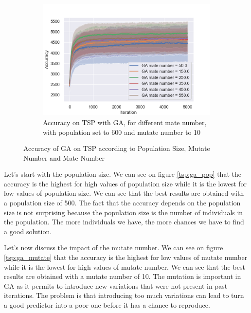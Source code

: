 \documentclass[10pt]{article}
\begin{document}
\begin{figure}[h]
\begin{subfigure}[t]{0.32\columnwidth}
						\includegraphics[width=\linewidth]{../graphics/tsp_GA_Iteration_Error_GA_mate_number.png}
						\caption{Accuracy on TSP with GA, for different mate number, with population set to 600 and mutate number to 10}
						\label{tsp:ga_mate}
					\end{subfigure}
					\caption{Accuracy of GA on TSP according to Population Size, Mutate Number and Mate Number}
					\label{tsp:ga}
				\end{figure}

				Let's start with the population size. We can see on figure \ref{tsp:ga_pop} that the accuracy is the highest for high values of population size while it is the lowest for low values of population size. We can see that the best results are obtained with a population size of 500. The fact that the accuracy depends on the population size is not surprising because the population size is the number of individuals in the population. The more individuals we have, the more chances we have to find a good solution.

				Let's now discuss the impact of the mutate number. We can see on figure \ref{tsp:ga_mutate} that the accuracy is the highest for low values of mutate number while it is the lowest for high values of mutate number. We can see that the best results are obtained with a mutate number of 10. The mutation is important in GA as it permits to introduce new variations that were not present in past iterations. The problem is that introducing too much variations can lead to turn a good predictor into a poor one before it has a chance to reproduce.
\end{document}
